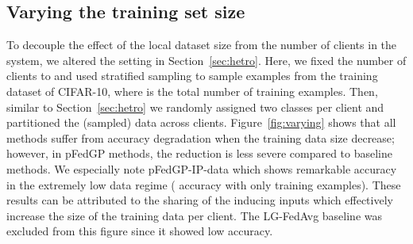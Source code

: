 \documentclass{article}
\def\Figref#1{Figure~\ref{#1}}
\def\Secref#1{Section~\ref{#1}}
\begin{document}
\subsection{Varying the training set size} \label{sec:varying_training_size}



To decouple the effect of the local dataset size from the number of clients in the system, we altered the setting in \Secref{sec:hetro}. Here, we fixed the number of clients to  and used stratified sampling to sample  examples from the training dataset of CIFAR-10, where  is the total number of training examples. Then, similar to \Secref{sec:hetro} we randomly assigned two classes per client and partitioned the (sampled) data across clients. \Figref{fig:varying} shows that all methods suffer from accuracy degradation when the training data size decrease; however, in pFedGP methods, the reduction is less severe compared to baseline methods. We especially note pFedGP-IP-data which shows remarkable accuracy in the extremely low data regime ( accuracy with only  training examples). These results can be attributed to the sharing of the inducing inputs which effectively increase the size of the training data per client. The LG-FedAvg baseline was excluded from this figure since it showed low accuracy.
\end{document}

